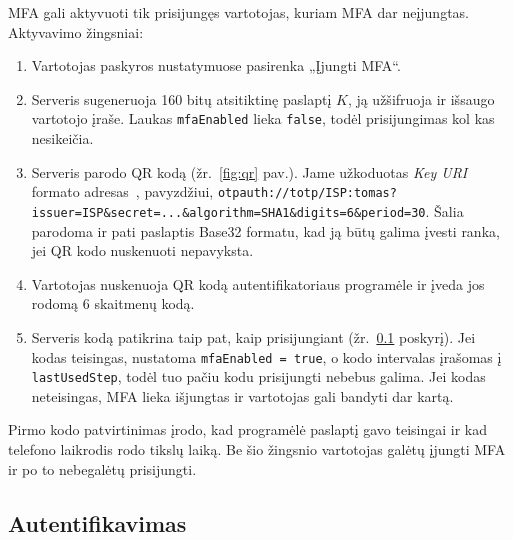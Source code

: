 MFA gali aktyvuoti tik prisijungęs vartotojas, kuriam MFA dar neįjungtas. Aktyvavimo žingsniai:
\begin{enumerate}
    \item Vartotojas paskyros nustatymuose pasirenka „Įjungti MFA“.
    \item Serveris sugeneruoja 160 bitų atsitiktinę paslaptį $K$, ją užšifruoja ir išsaugo vartotojo įraše. Laukas \texttt{mfaEnabled} lieka \texttt{false}, todėl prisijungimas kol kas nesikeičia.
    \item Serveris parodo QR kodą (žr.~\ref{fig:qr} pav.). Jame užkoduotas \textit{Key URI} formato adresas~\cite{key_uri}, pavyzdžiui, \nolinkurl{otpauth://totp/ISP:tomas?issuer=ISP&secret=...&algorithm=SHA1&digits=6&period=30}. Šalia parodoma ir pati paslaptis Base32 formatu, kad ją būtų galima įvesti ranka, jei QR kodo nuskenuoti nepavyksta.
    \item Vartotojas nuskenuoja QR kodą autentifikatoriaus programėle ir įveda jos rodomą 6 skaitmenų kodą.
    \item Serveris kodą patikrina taip pat, kaip prisijungiant (žr.~\ref{subsec:autentifikavimas} poskyrį). Jei kodas teisingas, nustatoma \texttt{mfaEnabled = true}, o kodo intervalas įrašomas į \texttt{lastUsedStep}, todėl tuo pačiu kodu prisijungti nebebus galima. Jei kodas neteisingas, MFA lieka išjungtas ir vartotojas gali bandyti dar kartą.
\end{enumerate}

Pirmo kodo patvirtinimas įrodo, kad programėlė paslaptį gavo teisingai ir kad telefono laikrodis rodo tikslų laiką. Be šio žingsnio vartotojas galėtų įjungti MFA ir po to nebegalėtų prisijungti.

\subsection{Autentifikavimas}
\label{subsec:autentifikavimas}

